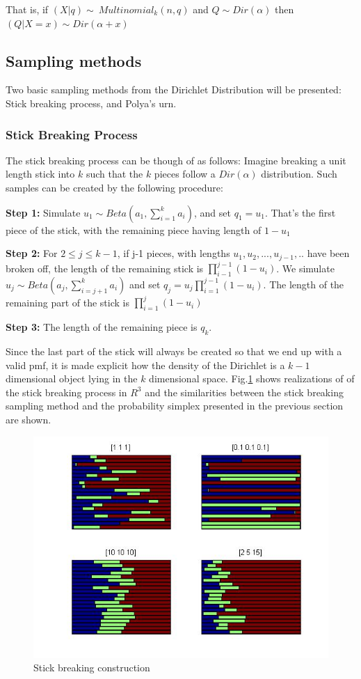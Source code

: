 \documentclass[twoside,hidelinks]{article}
\begin{document}
That is,  if $ (X|q) \sim\ Multinomial_k(n,q) $ and $ Q \sim Dir( \alpha ) $ then $( Q| X=x) \sim Dir( \alpha + x) $

\subsection{Sampling methods}

Two basic sampling methods from the Dirichlet Distribution will be presented: Stick breaking process, and Polya's urn.

\subsubsection{Stick Breaking Process}

The stick breaking process can be though of as follows: Imagine breaking a unit length stick into $k$ such that the $k$ pieces follow a $Dir( \alpha)$  distribution. Such samples can be created by the following procedure:
\begin{compactitem}
	\item  \textbf{Step 1:} Simulate $ u_1 \sim Beta(a_1, \sum_{i=1}^k a_i ) $, and set $q_1 = u_1$. That's the first piece of the stick, with the remaining piece having length of $ 1-u_1$
	\item \textbf{Step 2:} For $ 2 \leq j \leq k-1$, if j-1 pieces, with lengths  $u_1,u_2,...,u_{j-1},..$ have been broken off, the length of the remaining stick is $\prod_{i-1}^{j-1} (1 - u_i) $. We simulate $ u_j \sim Beta( a_j, \sum_{i=j+1}^k a_i) $ and set  $q_j=u_j \prod_{i=1}^{j-1}(1-u_i)$. The length of the remaining part of the stick is  $\prod_{i=1}^{j}(1-u_i)$
	\item  \textbf{Step 3:} The length of the remaining piece is $q_k$.


\end{compactitem}
Since the last part of the stick will always be created so that we end up with a valid pmf, it is made explicit how the density of the Dirichlet is  a ${k-1}$ dimensional object lying in the $k$ dimensional space. Fig.\ref{stickR3} shows realizations of of the stick breaking process in $R^3$ and the similarities between the stick breaking sampling method and the probability simplex presented in the previous section are shown.

\begin{figure}[!h]
    \centerline{\includegraphics[width=.55\textwidth]{stickBreaking}}
\caption{Stick breaking construction}
\label{stickR3}
\end{figure}
\end{document}
